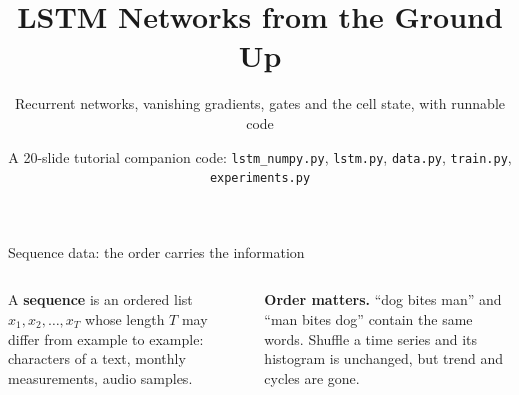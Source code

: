 \documentclass[aspectratio=169,10pt]{beamer}
\title{LSTM Networks from the Ground Up}
\subtitle{Recurrent networks, vanishing gradients, gates and the cell state, with runnable code}
\date{A 20-slide tutorial \textbullet{} companion code: \texttt{lstm\_numpy.py}, \texttt{lstm.py},
      \texttt{data.py}, \texttt{train.py}, \texttt{experiments.py}}
\newcommand{\key}[1]{\textbf{\color{cAtt}#1}}
\begin{document}
\maketitle
\addtocounter{framenumber}{1}

\begin{frame}{Sequence data: the order carries the information}
\begin{columns}[T,onlytextwidth]
\small
A \key{sequence} is an ordered list $x_1,x_2,\dots,x_T$ whose length $T$ may differ from example to
example: characters of a text, monthly measurements, audio samples.

\vspace{1mm}
\textbf{Order matters.} ``dog bites man'' and ``man bites dog'' contain the same words. Shuffle a
time series and its histogram is unchanged, but trend and cycles are gone.


\end{columns}
\end{frame}
\end{document}
